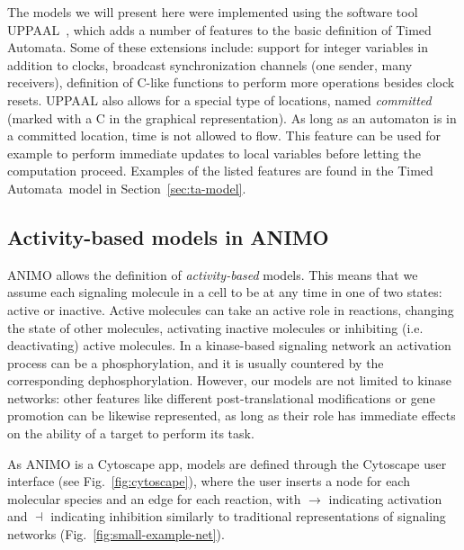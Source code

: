 \documentclass{llncs}
\newcommand{\tas}{Timed Automata}
\begin{document}
The models we will present here were implemented using the software tool UPPAAL~\cite{uppaal}, which adds a number of features
to the basic definition of \tas. Some of these extensions include: support for integer variables in addition to clocks,
broadcast synchronization channels (one sender, many receivers), definition of C-like functions to perform more 
operations besides clock resets.
UPPAAL also allows for a special type of locations, named \emph{committed} (marked with a {\sf C} in the graphical representation).
As long as an automaton is in a committed location, time is not allowed to flow. This feature can be used for example to perform immediate
updates to local variables before letting the computation proceed. Examples of the listed features are found in the
\tas\ model in Section~\ref{sec:ta-model}.


\subsection{Activity-based models in ANIMO}\label{sec:animo-old}
ANIMO allows the definition of \emph{activity-based} models. This means that we assume each signaling molecule in a
cell to be at any time in one of two states: active or inactive. Active molecules can take an active role in reactions,
changing the state of other molecules, activating inactive molecules or inhibiting (i.e. deactivating) active molecules.
In a kinase-based signaling network an activation process can be
a phosphorylation, and it is usually countered by the corresponding dephosphorylation. However, 
our models are not limited to kinase networks: other features like different post-translational
modifications or gene promotion can be likewise represented, as long as their role has immediate effects on the ability of a
target to perform its task.

As ANIMO is a Cytoscape app, models are defined through the Cytoscape user interface (see Fig.~\ref{fig:cytoscape}), where the user inserts
a node for each molecular species and an edge for each reaction, with $\rightarrow$ indicating activation
and $\dashv$ indicating inhibition similarly to traditional representations of signaling networks (Fig.~\ref{fig:small-example-net}).
\end{document}
